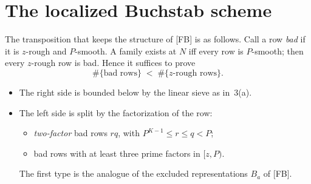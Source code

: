 \documentclass[11pt,a4paper]{article}
\theoremstyle{remark}
\begin{document}
\section{The localized Buchstab scheme}
The transposition that keeps the structure of [FB] is as follows. Call a row \emph{bad} if it is
$z$-rough and $P$-smooth. A family exists at $N$ iff every row is $P$-smooth; then every $z$-rough
row is bad. Hence it suffices to prove
\begin{equation}\label{eq:target}
\#\{\text{bad rows}\} \;<\; \#\{z\text{-rough rows}\}.
\end{equation}
\begin{itemize}
\item The right side is bounded below by the linear sieve as in~3(a).
\item The left side is split by the factorization of the row:
  \begin{itemize}
  \item \emph{two-factor} bad rows $rq$, with $P^{K-1}\le r\le q<P$;
  \item bad rows with at least three prime factors in $[z,P)$.
  \end{itemize}
  The first type is the analogue of the excluded representations $B_a$ of [FB].
\end{itemize}
\end{document}
